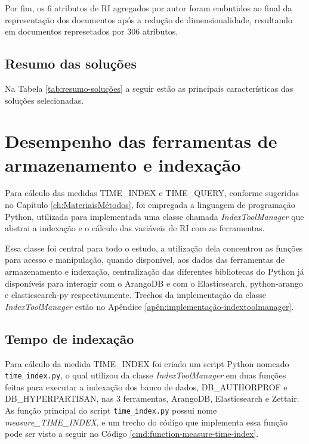 				

				Por fim, os 6 atributos de RI agregados por autor foram embutidos ao final da representação dos documentos após a redução de dimensionalidade, resultando em documentos represetados por 306 atributos.


		\subsection{Resumo das soluções} \label{sec:ResumoDasSoluções}
			Na Tabela \ref{tab:resumo-soluções} a seguir estão as principais características das soluções selecionadas.

			

	\section{Desempenho das ferramentas de armazenamento e indexação} \label{sec:DesempenhoFerramentas}
		Para cálculo das medidas TIME\_INDEX e TIME\_QUERY, conforme sugeridas no Capítulo \ref{ch:MateriaisMétodos}, foi empregada a linguagem de programação Python, utilizada para implementada uma classe chamada \textit{IndexToolManager} que abstrai a indexação e o cálculo das variáveis de RI com as ferramentas. 

		Essa classe foi central para todo o estudo, a utilização dela concentrou as funções para acesso e manipulação, quando disponível, aos dados das ferramentas de armazenamento e indexação, centralização das diferentes bibliotecas do Python já disponíveis para interagir com o ArangoDB e com o Elasticsearch, python-arango e elasticsearch-py respectivamente. 
		Trechos da implementação da classe \textit{IndexToolManager} estão no Apêndice \ref{apên:implementação-indextoolmanager}.
		\subsection{Tempo de indexação}
			Para cálculo da medida TIME\_INDEX foi criado um script Python nomeado \texttt{time\_index.py}, o qual utilizou da classe \textit{IndexToolManager} em duas funções feitas para executar a indexação dos banco de dados, DB\_AUTHORPROF e DB\_HYPERPARTISAN, nas 3 ferramentas, ArangoDB, Elasticsearch e Zettair.
			As função principal do script \texttt{time\_index.py} possui nome \textit{measure\_TIME\_INDEX}, e um trecho do código que implementa essa função pode ser visto a seguir no Código \ref{cmd:function-measure-time-index}.

